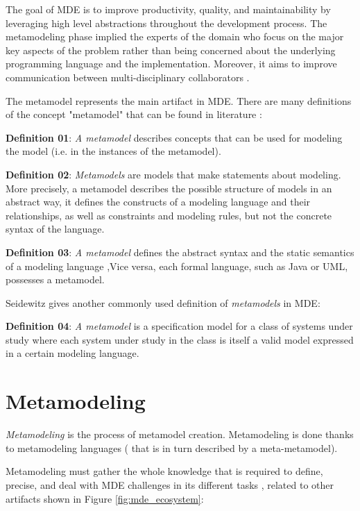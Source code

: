 The goal of MDE is to improve productivity, quality, and maintainability by leveraging high level abstractions throughout the development process. The metamodeling phase implied the experts of the domain who focus on the major key aspects of the problem rather than being concerned about the underlying programming language and the implementation. Moreover, it aims to improve communication between multi-disciplinary collaborators \cite{wortmann2020modeling}.

The metamodel represents the main artifact in MDE. There are many definitions of the concept "metamodel" that can be found in literature \cite{stahl2006model}:

\textbf{Definition 01}: \textit{A metamodel} describes concepts that can be used for modeling the model (i.e. in the instances of the metamodel).

\textbf{Definition 02}: \textit {Metamodels} are models that make statements about modeling. More precisely, a metamodel describes the possible structure of models in an abstract way, it defines the constructs of a modeling language and their relationships, as well as constraints and modeling rules, but not the concrete syntax of the language.

\textbf{Definition 03}: \textit{A metamodel} defines the abstract syntax and the static semantics of a modeling language ,Vice versa, each formal language, such as Java or UML, possesses a metamodel.

Seidewitz \cite{seidewitz2003models} gives another commonly used definition of \textit{metamodels} in MDE:

\textbf{Definition 04}: \textit{A metamodel} is a specification model for a class of systems under study where each system under study in the class is itself a valid model expressed in a certain modeling language.

\section{Metamodeling}
\label{Metamodeling}
\textit{Metamodeling} is the process of metamodel creation. Metamodeling is done thanks to metamodeling languages ( that is in turn described by a meta-metamodel).

Metamodeling must gather the whole  knowledge that is required to define, precise, and deal with MDE challenges in its different tasks \cite{wortmann2020modeling}, related to other artifacts shown in Figure \ref{fig:mde_ecosystem}:

